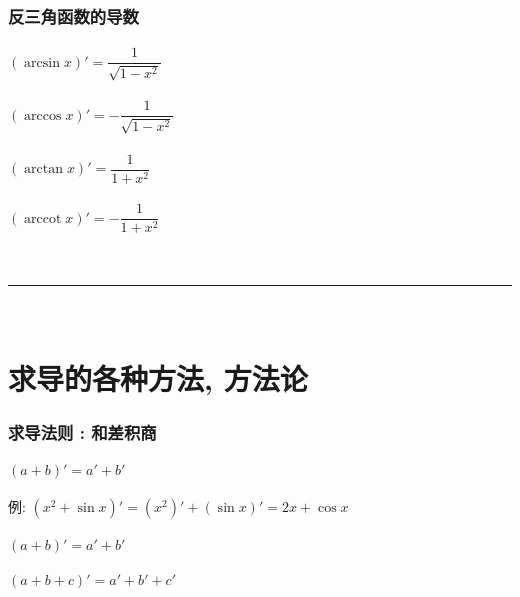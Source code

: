 \documentclass[UTF8]{ctexart}
\begin{document}
\section{反三角函数的导数}

\subsection{$(\arcsin x)' = \dfrac{1} {\sqrt{1-x^2}}$}

\subsection{$(\arccos x)' = - \dfrac{1} {\sqrt{1-x^2}}$}

\subsection{$(\arctan x)' =  \dfrac{1} {1 + x^2}$}

\subsection{$(\operatorname{arccot}  x)' = - \dfrac{1} {1 + x^2}$}


~\\
\hrule
~\\



\part{求导的各种方法, 方法论}



\section{求导法则 : 和差积商}


\subsection{$(a+b)' = a'+b'$}

例: $ \left( x^2+\sin x \right) '=\left( x^2 \right) '+\left( \sin x \right) '=2x +\cos x $


\subsection{$(a+b)' = a'+b'$}

\subsection{$(a+b+c)' = a'+b'+c'$}
\end{document}
